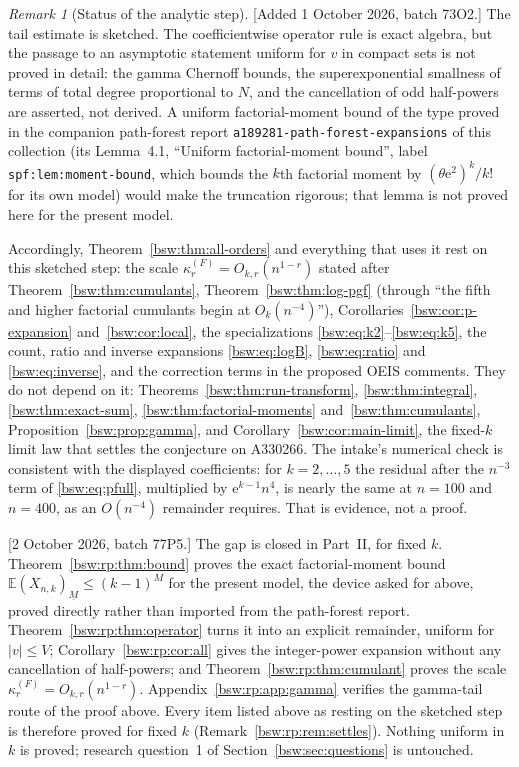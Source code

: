 \documentclass[11pt,letterpaper]{article}
\theoremstyle{definition}
\theoremstyle{remark}
\newtheorem{remark}[theorem]{Remark}
\newcommand{\EE}{\mathbb E}
\newcommand{\ee}{\mathrm e}
\newcommand{\fall}[2]{(#1)_{\underline{#2}}}
\begin{document}
\begin{remark}[Status of the analytic step]\label{bsw:rem:tail-sketch}
[Added 1 October 2026, batch 73O2.]  The tail estimate is sketched.  The
coefficientwise operator rule is exact algebra, but the passage to an
asymptotic statement uniform for $v$ in compact sets is not proved in detail:
the gamma Chernoff bounds, the superexponential smallness of terms of total
degree proportional to $N$, and the cancellation of odd half-powers are
asserted, not derived.  A uniform factorial-moment bound of the type proved in
the companion path-forest report \texttt{a189281-path-forest-expansions} of
this collection (its Lemma~4.1, ``Uniform factorial-moment bound'', label
\texttt{spf:lem:moment-bound}, which bounds the $k$th factorial moment by
$(\theta\ee^2)^k/k!$ for its own model) would make the truncation rigorous; that
lemma is not proved here for the present model.

Accordingly, Theorem~\ref{bsw:thm:all-orders} and everything that uses it
rest on this sketched step: the scale $\kappa_r^{(F)}=O_{k,r}(n^{1-r})$ stated
after Theorem~\ref{bsw:thm:cumulants}, Theorem~\ref{bsw:thm:log-pgf}
(through ``the fifth and higher factorial cumulants begin at
$O_k(n^{-4})$''), Corollaries~\ref{bsw:cor:p-expansion}
and~\ref{bsw:cor:local}, the specializations
\eqref{bsw:eq:k2}--\eqref{bsw:eq:k5}, the count, ratio and inverse expansions
\eqref{bsw:eq:logB}, \eqref{bsw:eq:ratio} and \eqref{bsw:eq:inverse}, and the
correction terms in the proposed OEIS comments.  They do not depend on it:
Theorems~\ref{bsw:thm:run-transform}, \ref{bsw:thm:integral},
\ref{bsw:thm:exact-sum}, \ref{bsw:thm:factorial-moments}
and~\ref{bsw:thm:cumulants}, Proposition~\ref{bsw:prop:gamma}, and
Corollary~\ref{bsw:cor:main-limit}, the fixed-$k$ limit law that settles the
conjecture on A330266.  The intake's numerical check is consistent with the
displayed coefficients: for $k=2,\ldots,5$ the residual after the
$n^{-3}$ term of \eqref{bsw:eq:pfull}, multiplied by $\ee^{k-1}n^4$, is
nearly the same at $n=100$ and $n=400$, as an $O(n^{-4})$ remainder requires.
That is evidence, not a proof.

[2 October 2026, batch 77P5.]  The gap is closed in Part~II, for fixed $k$.
Theorem~\ref{bsw:rp:thm:bound} proves the exact factorial-moment bound
$\EE\fall{X_{n,k}}M\le(k-1)^M$ for the present model, the device asked for
above, proved directly rather than imported from the path-forest report.
Theorem~\ref{bsw:rp:thm:operator} turns it into an explicit remainder,
uniform for $|v|\le V$; Corollary~\ref{bsw:rp:cor:all} gives the
integer-power expansion without any cancellation of half-powers; and
Theorem~\ref{bsw:rp:thm:cumulant} proves the scale
$\kappa_r^{(F)}=O_{k,r}(n^{1-r})$.  Appendix~\ref{bsw:rp:app:gamma}
verifies the gamma-tail route of the proof above.  Every item listed above
as resting on the sketched step is therefore proved for fixed $k$
(Remark~\ref{bsw:rp:rem:settles}).  Nothing uniform in $k$ is proved;
research question~1 of Section~\ref{bsw:sec:questions} is untouched.


\end{remark}
\end{document}
